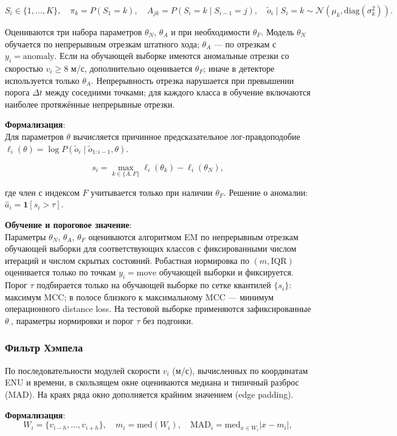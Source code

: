 \documentclass[a4paper,12pt]{report}
\begin{document}
	$$S_i\in\{1,\ldots,K\}, \quad \pi_k=P(S_1=k), \quad A_{jk}=P(S_i=k\mid S_{i-1}=j), \quad \tilde o_i\mid S_i=k \sim \mathcal N(\mu_k,\mathrm{diag}(\sigma_k^2)).$$

	Оцениваются три набора параметров $\theta_N$, $\theta_A$ и при необходимости $\theta_F$. Модель $\theta_N$ обучается по непрерывным отрезкам штатного хода; $\theta_A$ — по отрезкам с $y_i=\mathrm{anomaly}$. Если на обучающей выборке имеются аномальные отрезки со скоростью $v_i \ge 8$ м/с, дополнительно оценивается $\theta_F$; иначе в детекторе используется только $\theta_A$. Непрерывность отрезка нарушается при превышении порога $\Delta t$ между соседними точками; для каждого класса в обучение включаются наиболее протяжённые непрерывные отрезки.

	\textbf{Формализация}:\\
	Для параметров $\theta$ вычисляется причинное предсказательное лог-правдоподобие $\ell_i(\theta)=\log P(\tilde o_i\mid \tilde o_{1:i-1},\theta)$.

	$$s_i = \max_{k\in\{A,F\}} \ell_i(\theta_k) - \ell_i(\theta_N),$$

	где член с индексом $F$ учитывается только при наличии $\theta_F$. Решение о аномалии: $\hat a_i = \mathbf{1}[s_i > \tau]$.

	\textbf{Обучение и пороговое значение}:\\
	Параметры $\theta_N$, $\theta_A$, $\theta_F$ оцениваются алгоритмом EM по непрерывным отрезкам обучающей выборки для соответствующих классов с фиксированными числом итераций и числом скрытых состояний. Робастная нормировка по $(m,\mathrm{IQR})$ оценивается только по точкам $y_i=\mathrm{move}$ обучающей выборки и фиксируется. Порог $\tau$ подбирается только на обучающей выборке по сетке квантилей $\{s_i\}$: максимум MCC; в полосе близкого к максимальному MCC — минимум операционного distance loss. На тестовой выборке применяются зафиксированные $\theta_\cdot$, параметры нормировки и порог $\tau$ без подгонки.

	\subsubsection{Фильтр Хэмпела}
	По последовательности модулей скорости $v_i$ (м/с), вычисленных по координатам ENU и времени, в скользящем окне оцениваются медиана и типичный разброс (MAD). На краях ряда окно дополняется крайним значением (edge padding).

	\textbf{Формализация}:\\
	$$W_i=\{v_{i-h},\ldots,v_{i+h}\}, \quad m_i=\mathrm{med}(W_i), \quad \mathrm{MAD}_i=\mathrm{med}_{x\in W_i}|x-m_i|,$$
\end{document}
